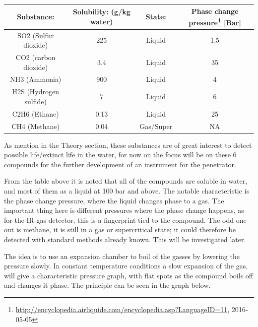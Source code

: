 \begin{center}
  \begin{tabular}{|c | c | c | c|}
    \hline
     Substance: & Solubility: (g/kg water) & State: & Phase change pressure\footnote{\url{http://encyclopedia.airliquide.com/encyclopedia.asp?LanguageID=11}, 2016-05-05} [Bar] \\ [0.5ex]
    \hline
    SO2 (Sulfur dioxide) & 225 & Liquid & 1.5\\
    \hline
    CO2 (carbon dioxide) & 3.4 & Liquid & 35\\
    \hline
    NH3 (Ammonia) & 900 & Liquid & 4\\
    \hline
    H2S (Hydrogen sulfide) & 7 & Liquid & 6\\
    \hline
    C2H6 (Ethane) & 0.13 & Liquid & 25\\
    \hline
    CH4 (Methane) & 0.04 & Gas/Super & NA\\
    \hline
  \end{tabular}
\end{center}

As mention in the Theory section, these substances are of great interest to detect possible life/extinct life in the water, for now on the focus will be on these 6 compounds for the further development of an instrument for the penetrator.

From the table above it is noted that all of the compounds are soluble in water, and most of them as a liquid at 100 bar and above. The notable characteristic is the phase change pressure, where the liquid changes phase to a gas. The important thing here is different pressures where the phase change happens, as for the IR-gas detector, this is a fingerprint tied to the compound. The odd one out is methane, it is still in a gas or supercritical state; it could therefore be detected with standard methods already known.  This will be investigated later.

The idea is to use an expansion chamber to boil of the gasses by lowering the pressure slowly. In constant temperature conditions a slow expansion of the gas, will give a characteristic pressure graph, with flat spots as the compound boils off and changes it phase. The principle can be seen in the graph below.


